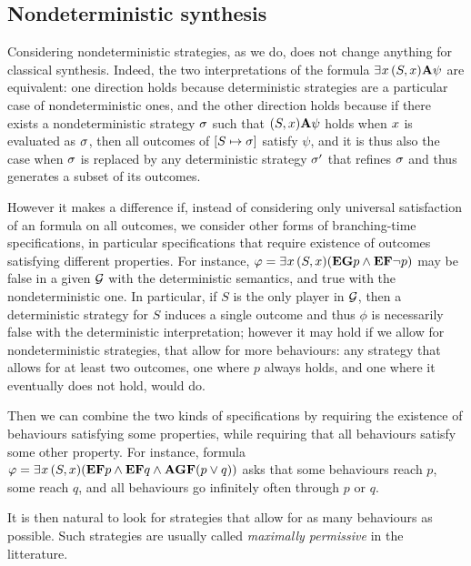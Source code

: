 \subsection{Nondeterministic synthesis}
\label{sec-nd-synth}

Considering nondeterministic strategies, as we do, does not change
anything for classical \LTL synthesis. Indeed, the two interpretations of
the formula $\exists^{} x\, (S,x) {\bf A} \psi$ are equivalent: one direction
holds because deterministic strategies are a particular case of
nondeterministic ones, and the other direction holds because if there
exists a nondeterministic strategy $\sigma$ such that $(S,x){\bf A}\psi$
holds when $x$ is evaluated as $\sigma$, then all outcomes of
$[S\mapsto \sigma]$ satisfy $\psi$, and it is thus also the case when $\sigma$
is replaced by any deterministic strategy $\sigma'$ that refines
$\sigma$ and thus generates a subset of its outcomes.

However it makes a difference if, instead of considering only
universal satisfaction of an \LTL formula on all outcomes, we consider
other forms of branching-time specifications, in particular
specifications that require existence of outcomes satisfying different
properties. For instance,
$\varphi=\exists^{} x\, (S,x) ({\bf E} {\bf G} p \wedge {\bf E} {\bf F} \neg p)$ may be false in a
given \CGS $\CGS$ with the deterministic semantics, and true with the
nondeterministic one.  In particular, if $S$ is the only player in
$\CGS$, then a deterministic strategy for $S$ induces a single outcome
and thus $\phi$ is necessarily false with the deterministic
interpretation; however it may hold if we allow for nondeterministic
strategies, that allow for more behaviours: any strategy that allows
for at least two outcomes, one where $p$ always holds, and one where
it eventually does not hold, would do.

Then we can combine the two kinds of specifications by  requiring the
existence of behaviours satisfying some properties, while requiring
that all  behaviours satisfy some other property.
For instance, formula $\varphi=\exists^{} x\, (S,x) ({\bf E} {\bf F} p \wedge {\bf E} {\bf F}
 q \wedge {\bf A} {\bf G} {\bf F} (p\vee q))$ asks that some behaviours 
 reach $p$, some  reach $q$, and all behaviours go infinitely
 often through $p$ or $q$.

It is then natural to look for  strategies that allow for as many
behaviours as possible. Such strategies are usually called
\emph{maximally permissive} in the litterature.


